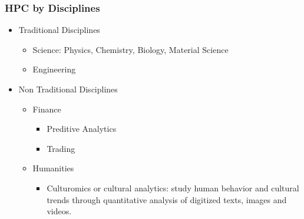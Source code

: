 \documentclass[slidestop,mathserif,compress,xcolor=svgnames,table]{beamer}
\begin{document}
\begin{frame}
  \frametitle{\small HPC by Disciplines}
  \begin{itemize}
    \item Traditional Disciplines
    \begin{itemize}
      \item Science: Physics, Chemistry, Biology, Material Science
      \item Engineering
    \end{itemize}
    \item Non Traditional Disciplines
    \begin{itemize}
      \item Finance
      \begin{itemize}
        \item Preditive Analytics
        \item Trading
      \end{itemize}
      \item Humanities
      \begin{itemize}
        \item Culturomics or cultural analytics: study human behavior and cultural trends through quantitative analysis of digitized texts, images and videos.
      \end{itemize}
    \end{itemize}
  \end{itemize}
\end{frame}
\end{document}
